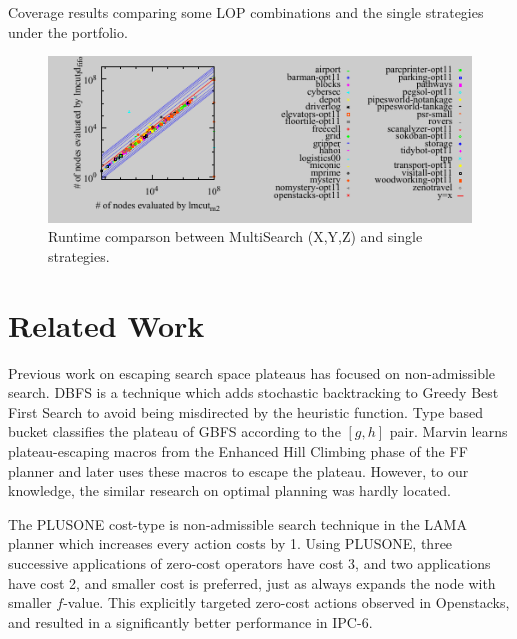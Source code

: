 \begin{table}[htb]
 \centering {}
 
 \caption{Coverage results comparing some LOP combinations and the
 single strategies under the portfolio. }
 \label{portfolio-coverage}
\end{table}

\begin{figure}[htb]
 \centering
 \includegraphics{tables/aaai16-5min/aaai16prelim3/evaluated-lmcut_m2-lmcut_ld_fifo.pdf}
 \caption{Runtime comparson between MultiSearch (X,Y,Z) and single strategies.}
 \label{portfolio-runtime}
\end{figure}


\section{Related Work}
\label{sec-4}

Previous work on escaping search space plateaus has focused on non-admissible search.
DBFS \cite{imai2011novel} is a technique which adds stochastic
backtracking to Greedy Best First Search to avoid being misdirected by the
heuristic function. Type based bucket \cite{xie14type} 
classifies the plateau of GBFS according to the $[g,h]$ pair.
Marvin \cite{Coles07} learns plateau-escaping macros from the Enhanced
Hill Climbing phase of the FF planner \cite{Hoffmann01} and later uses
these macros to escape the plateau.  However, to our knowledge, the
similar research on optimal planning was hardly located.

The PLUSONE cost-type is  non-admissible search technique in the LAMA planner \cite{richter2010lama}
which increases every action costs by 1.
Using PLUSONE, three successive
applications of zero-cost operators have cost 3, and two
applications have cost 2, and smaller cost is preferred, just as
\astar always expands the node with smaller $f$-value.
This explicitly targeted zero-cost actions observed in Openstacks,
and resulted in a significantly better performance in IPC-6.


